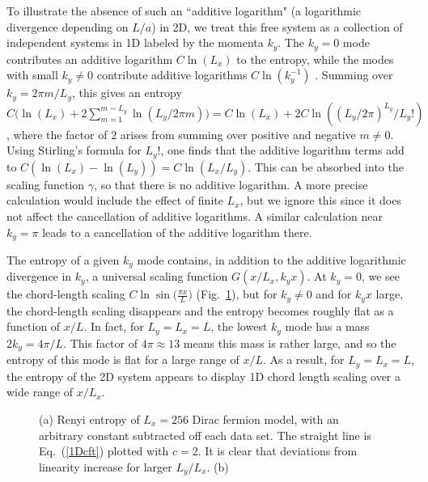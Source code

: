 \documentclass[prl,aps,twocolumn,floatfix,amsmath,amssymb,superscriptaddress,tightenlines]{revtex4}
\begin{document}
To illustrate the absence of such an ``additive logarithm" (a logarithmic divergence depending on $L/a$) in 2D,
we treat this free system as a collection of independent systems in 1D labeled by the momenta $k_y$.
The $k_y=0$ mode contributes an additive logarithm $C \ln(L_x)$ to the entropy, while the modes with small $k_y \neq 0$ contribute additive logarithms $C \ln(k_y^{-1})$ \cite{Holzhey,Korepin,Cardy}. Summing over $k_y=2\pi m/L_y$, this gives an entropy $C \big( \ln(L_x)+2\sum_{m=1}^{m \sim L_y} \ln(L_y/2 \pi m) \big)=C\ln(L_x) + 2 C\ln((L_y/2\pi)^{L_y}/L_y!)$, where the factor of $2$ arises from summing over positive and negative $m\neq 0$.  Using Stirling's formula for $L_y!$, one finds that the additive logarithm terms add to $C(\ln(L_x)-\ln(L_y))=C\ln(L_x/L_y)$. This can be absorbed into the scaling function $\gamma$, so that there is no additive logarithm.  A more precise calculation would include the effect of finite $L_x$, but we ignore this since it does not affect the cancellation of additive logarithms. A similar calculation near $k_y=\pi$ leads to a cancellation of the additive logarithm there.


The entropy of a given $k_y$ mode contains, in addition to the additive logarithmic divergence in $k_y$, a universal scaling function $G(x/L_x,k_y x)$.  At $k_y=0$, we see the chord-length scaling $C \ln\sin\big( \frac{\pi x}{L} \big)$ (Fig.~\ref{fig:dirac}), but for $k_y \neq 0$ and for $k_y x$ large, the chord-length scaling disappears and the entropy becomes roughly flat as a function of $x/L$.  In fact, for $L_y=L_x=L$, the lowest $k_y$ mode has a mass $2 k_y=4\pi/L$. This factor of $4\pi\approx 13$ means this mass is rather large, and so the entropy of this mode is flat for a large range of $x/L$.  As a result, for $L_y=L_x=L$, the entropy of the 2D system appears to display 1D chord length scaling over a wide range of $x/L_x$.

 \begin{figure}
   \begin{center}
   \end{center}
   \caption{(a) Renyi entropy of $L_x=256$ Dirac fermion model, with an arbitrary constant subtracted off each data set.
    The straight line is Eq.~(\ref{1Dcft}) plotted with $c=2$.
    It is clear that deviations from linearity increase for larger $L_y/L_x$. (b) 
   }
   \label{fig:dirac}
 \end{figure}
 
\end{document}
